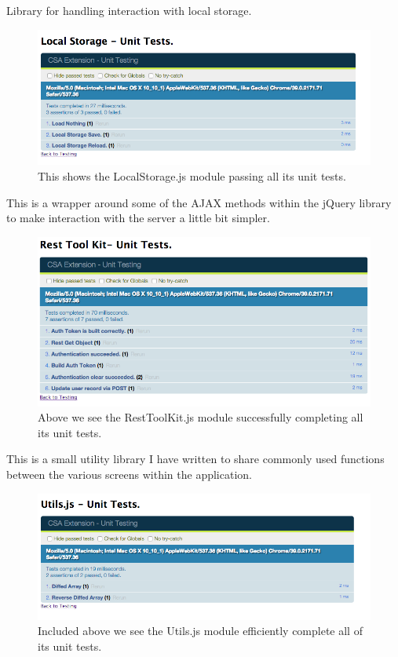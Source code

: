 \documentclass{article}
\begin{document}
Library for handling interaction with local storage.\\
\begin{figure}[H]
\centering
\includegraphics[width=\textwidth]{lsqunit}
\caption{This shows the LocalStorage.js module passing all its unit tests.}
\end{figure}

This is a wrapper around some of the AJAX methods within the jQuery library to make interaction with the server a little bit simpler.\\

\begin{figure}[H]
\centering
\includegraphics[width=\textwidth]{restqunit}
\caption{Above we see the RestToolKit.js module successfully completing all its unit tests.}
\end{figure}

This is a small utility library I have written to share commonly used functions between the various screens within the application.\\

\begin{figure}[H]
\centering
\includegraphics[width=\textwidth]{utilsqunit}
\caption{Included above we see the Utils.js module efficiently complete all of its unit tests.}
\end{figure}
\end{document}
